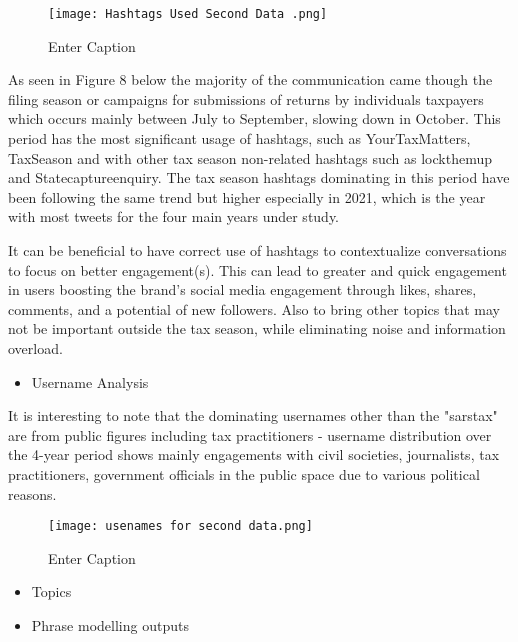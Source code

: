 \begin{figure}
    \centering
    \texttt{[image: Hashtags Used Second Data .png]}
    \caption{Enter Caption}
    \label{fig:enter-label}
\end{figure}

As seen in Figure 8 below the majority of the communication came though the filing season or campaigns for submissions of returns by individuals taxpayers which occurs mainly between July to September, slowing down in October. This period has the most significant usage of hashtags, such as YourTaxMatters, TaxSeason and with other tax season non-related hashtags such as lockthemup and Statecaptureenquiry.  The tax season hashtags dominating in this period have been following the same trend but higher especially in 2021, which is the year with most tweets for the four main years under study. 

\cite{alsini2021hashtag} It can be beneficial to have correct use of hashtags to contextualize conversations to focus on better engagement(s).  This can lead to greater and quick engagement in users boosting the brand’s social media engagement through likes, shares, comments, and a potential of new followers. Also to bring other topics that may not be important outside the tax season, while eliminating noise and information overload.

\begin{itemize}
    \item Username Analysis
\end{itemize}

It is interesting to note that the dominating usernames other than the "sarstax" are from public figures including tax practitioners - username distribution over the 4-year period shows mainly engagements with civil societies, journalists, tax practitioners, government officials in the public space due to various political reasons.  

\begin{figure}
    \centering
    \texttt{[image: usenames for second data.png]}
    \caption{Enter Caption}
    \label{fig:enter-label}
\end{figure}

\begin{itemize}
    \item Topics 
\end{itemize}

\begin{itemize}
    \item Phrase modelling outputs
\end{itemize}


